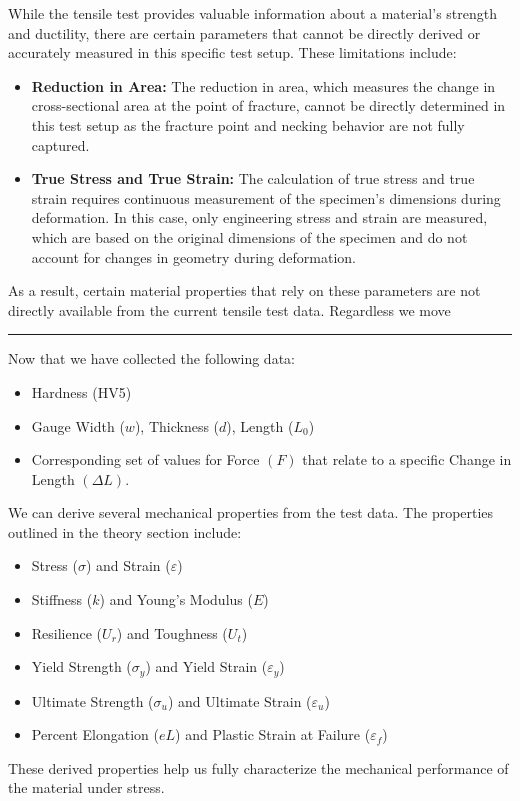 \documentclass{article}
\begin{document}
    While the tensile test provides valuable information about a material's strength and ductility, there are certain parameters that cannot be directly derived or accurately measured in this specific test setup. These limitations include:
    \begin{itemize}[left=0pt, itemsep=-1mm]
        \item \textbf{Reduction in Area:} The reduction in area, which measures the change in cross-sectional area at the point of fracture, cannot be directly determined in this test setup as the fracture point and necking behavior are not fully captured.
        \item \textbf{True Stress and True Strain:} The calculation of true stress and true strain requires continuous measurement of the specimen's dimensions during deformation. In this case, only engineering stress and strain are measured, which are based on the original dimensions of the specimen and do not account for changes in geometry during deformation.
    \end{itemize}
    As a result, certain material properties that rely on these parameters are not directly available from the current tensile test data. Regardless we move\\
    \vspace{1em}
    \hrule
    \vspace{1em}
    Now that we have collected the following data:
    \begin{itemize}
        \item Hardness (HV5)
        \item Gauge Width (\(w\)), Thickness (\(d\)), Length (\(L_0\))
         \item Corresponding set of values for Force \((F)\) that relate to a specific Change in Length \((\Delta L)\).    
    \end{itemize}
    We can derive several mechanical properties from the test data. The properties outlined in the theory section include:
    \begin{itemize}
        \item Stress ($\sigma$) and Strain ($\varepsilon$)
        \item Stiffness ($k$) and Young's Modulus ($E$)
        \item Resilience ($U_r$) and Toughness ($U_t$)
        \item Yield Strength ($\sigma_y$) and Yield Strain ($\varepsilon_y$)
        \item Ultimate Strength ($\sigma_u$) and Ultimate Strain ($\varepsilon_u$)
        \item Percent Elongation ($eL$) and Plastic Strain at Failure ($\varepsilon_f$)    
    \end{itemize}
    These derived properties help us fully characterize the mechanical performance of the material under stress.
\end{document}
